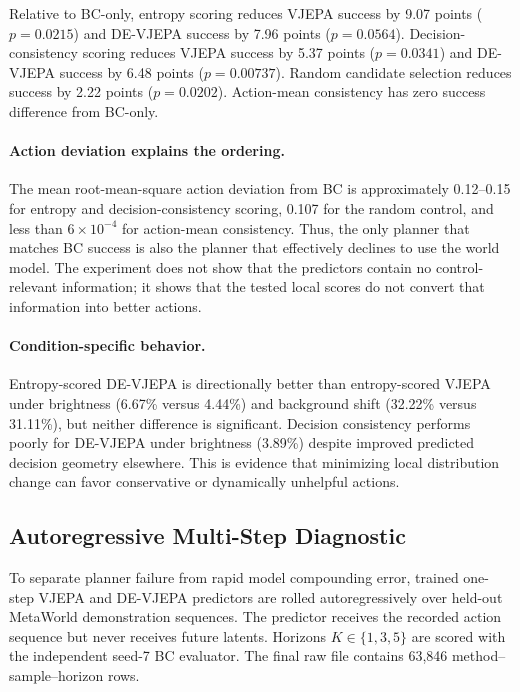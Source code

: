 \documentclass[10pt,twocolumn]{article}
\theoremstyle{tightstyle}
\begin{document}
Relative to BC-only, entropy scoring reduces VJEPA success by 9.07 points
($p=0.0215$) and DE-VJEPA success by 7.96 points ($p=0.0564$).
Decision-consistency scoring reduces VJEPA success by 5.37 points
($p=0.0341$) and DE-VJEPA success by 6.48 points ($p=0.00737$).
Random candidate selection reduces success by 2.22 points ($p=0.0202$).
Action-mean consistency has zero success difference from BC-only.

\paragraph{Action deviation explains the ordering.}
The mean root-mean-square action deviation from BC is approximately 0.12--0.15
for entropy and decision-consistency scoring, 0.107 for the random control, and
less than $6\times10^{-4}$ for action-mean consistency. Thus, the only planner
that matches BC success is also the planner that effectively declines to use
the world model. The experiment does not show that the predictors contain no
control-relevant information; it shows that the tested local scores do not
convert that information into better actions.

\paragraph{Condition-specific behavior.}
Entropy-scored DE-VJEPA is directionally better than entropy-scored VJEPA under
brightness (6.67\% versus 4.44\%) and background shift (32.22\% versus
31.11\%), but neither difference is significant. Decision consistency performs
poorly for DE-VJEPA under brightness (3.89\%) despite improved predicted
decision geometry elsewhere. This is evidence that minimizing local
distribution change can favor conservative or dynamically unhelpful actions.

\subsection{Autoregressive Multi-Step Diagnostic}

To separate planner failure from rapid model compounding error, trained
one-step VJEPA and DE-VJEPA predictors are rolled autoregressively over held-out
MetaWorld demonstration sequences. The predictor receives the recorded action
sequence but never receives future latents. Horizons $K\in\{1,3,5\}$ are scored
with the independent seed-7 BC evaluator. The final raw file contains 63,846
method--sample--horizon rows.
\end{document}
